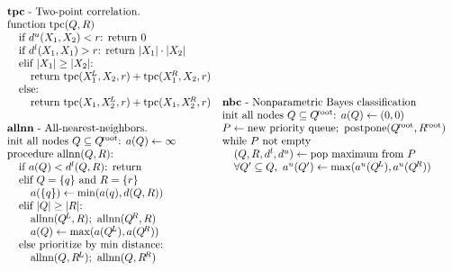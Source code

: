 \documentclass{article}
\newcommand{\disthrectmin}{d^{l}}
\newcommand{\disthrectmax}{d^{u}}
\newcommand{\dist}[2]{d(#1,#2)}
\newcommand{\kdroot}[1]{#1^{\!\text{root}}}
\newcommand{\kdleft}[1]{#1^{\!L}}
\newcommand{\kdright}[1]{#1^{\!R}}
\newcommand{\au}{a^u}
\newcommand{\dl}{d^l}
\newcommand{\du}{d^u}
\newcommand{\x}{\\ \hspace{0.15in}}
\newcommand{\xx}{\\ \hspace{0.3in}}
\begin{document}
\begin{figure}
  \begin{displaymath}
    \begin{array}{ll}
      \hspace{-0.17in}
      \begin{array}{l}
        \begin{array}{l}
          \text{{\bf tpc} - Two-point correlation.}
          \\ \text{function tpc}(Q, R)
          \x \text{if }\disthrectmax(X_1, X_2) < r\text{: return }0
          \x \text{if }\disthrectmin(X_1, X_1) > r\text{: return } |X_1| \cdot |X_2|
          \x \text{elif }|X_1| \geq |X_2|\text{:}
          \xx \text{return tpc}(\kdleft{X_1}, X_2, r) + \text{tpc}(\kdright{X_1}, X_2, r)
          \x \text{else:}
          \xx \text{return tpc}(X_1, \kdleft{X_2}, r) + \text{tpc}(X_1, \kdright{X_2}, r)
        \end{array}
        \\
        \\
        \begin{array}{l}
          \text{{\bf allnn} - All-nearest-neighbors.}
          \\ \text{init all nodes }Q \subseteq \kdroot{Q}\text{: }a(Q) \gets \infty
          \\ \text{procedure allnn}(Q,R)\text{:}
          \x \text{if }a(Q) < \disthrectmin(Q, R)\text{: return}
          \x \text{elif }Q = \{q\} \text{ and } R = \{r\}
          \xx a(\{q\}) \gets \min(a(q), \dist{Q}{R})
          \x \text{elif }|Q| \geq |R|\text{:}
          \xx \text{allnn}(\kdleft{Q}, R); \text{ allnn}(\kdright{Q}, R)
          \xx a(Q) \gets \max(a(\kdleft{Q}), a(\kdright{Q}))
          \x \text{else prioritize by min distance:}
          \xx \text{allnn}(Q, \kdleft{R}); \text{ allnn}(Q, \kdright{R})
        \end{array}
      \end{array}
      &
      \hspace{-0.2in}
      \begin{array}{l}
        \text{{\bf nbc} - Nonparametric Bayes classification}
        \\ \text{init all nodes }Q \subseteq \kdroot{Q}\text{: }a(Q) \gets (0, 0)
        \\ P \gets \text{new priority queue};~\text{postpone}(\kdroot{Q}, \kdroot{R})
        \\ \text{while } P \text{ not empty}
        \x (Q, R, \dl, \du) \gets \text{pop maximum from }P
        \x \forall Q' \subseteq Q,~ \au(Q') \gets \max(\au(\kdleft{Q}), \au(\kdright{Q}))

\end{array}
\end{array}
\end{displaymath}
\end{figure}
\end{document}
